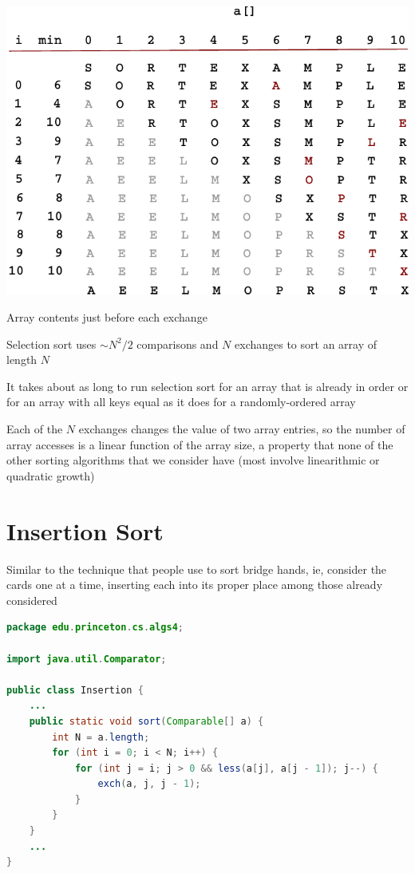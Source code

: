 \documentclass[8pt,a4paper,compress]{beamer}
\begin{document}
\begin{frame}[fragile]
\begin{center}
\includegraphics[scale=0.65]{./figures/selection_trace.pdf}

\smallskip

Array contents just before each exchange
\end{center}
\end{frame}

\begin{frame}[fragile]
Selection sort uses $\sim N^2/2$ comparisons and $N$ exchanges to sort an array of length $N$

\bigskip

It takes about as long to run selection sort for an array that is already in order or for an array with all keys equal as it does for a randomly-ordered array

\bigskip

Each of the $N$ exchanges changes the value of two array
entries, so the number of array accesses is a linear function of the array size, a property that none of the other sorting algorithms that we consider have (most involve linearithmic or quadratic growth)
\end{frame}

\section{Insertion Sort}
\begin{frame}[fragile]
Similar to the technique that people use to sort bridge hands, ie, consider the cards one at a time, inserting each into its proper place among those already considered

\bigskip

\begin{lstlisting}[language=Java]
package edu.princeton.cs.algs4;

import java.util.Comparator;

public class Insertion {
    ...
    public static void sort(Comparable[] a) {
        int N = a.length;
        for (int i = 0; i < N; i++) {
            for (int j = i; j > 0 && less(a[j], a[j - 1]); j--) {
                exch(a, j, j - 1);
            }
        }
    }
    ...
}
\end{lstlisting}
\end{frame}
\end{document}
